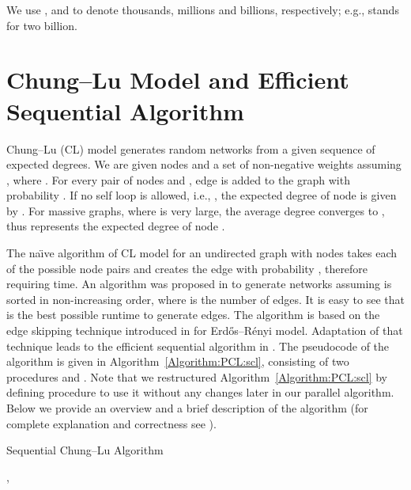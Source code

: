 \documentclass[conference,letterpaper,10pt]{IEEEtran}
\begin{document}
We use ,  and  to denote thousands, millions and billions, respectively; e.g.,  stands for two billion.


\section{Chung--Lu Model and Efficient Sequential Algorithm}
\label{Section:PCL:chung-lu-model}
Chung--Lu (CL) model \cite{Chung2002} generates random networks from a given sequence of expected degrees. We are given  nodes and a set of non-negative weights  assuming , where  \cite{Chung2002}. For every pair of nodes  and , edge  is added to the graph with probability .
If no self loop is allowed, i.e., , the expected degree of node  is given by . For massive graphs, where  is very large, the average degree converges to , thus  represents the expected degree of node  \cite{Miller2011}.

The na\"{\i}ve algorithm of CL model for an undirected graph with  nodes takes each of the  possible node pairs  and creates the edge with probability , therefore requiring  time. An  algorithm was proposed in \cite{Miller2011}  to generate networks assuming  is sorted in non-increasing order, where  is the number of edges. It is easy to see that  is the best possible runtime to generate  edges. The algorithm is based on the edge skipping technique introduced in \cite{Batagelj2005} for Erd\H{o}s--R\'enyi model. Adaptation of that technique leads to the efficient sequential algorithm in \cite{Miller2011}. The pseudocode of the algorithm is given in Algorithm~\ref{Algorithm:PCL:scl}, consisting of two procedures  and . Note that we restructured Algorithm~\ref{Algorithm:PCL:scl} by defining procedure  to use it without any changes later in our parallel algorithm. Below we provide an overview and a brief description of the algorithm (for complete explanation and correctness see \cite{Miller2011}). 
\begin{algorithm}[t]
\caption{Sequential Chung--Lu Algorithm}
\label{Algorithm:PCL:scl}
\begin{algorithmic}[1]
	\State{}\label{Line:PCL:SCL:S}
	\label{Line:PCL:SCL:CreateEdges}
\EndProcedure
{}
	\State{}
	\ForAll {  }\label{Line:PCL:SCL:foralli}
		\State \label{Line:PCL:SCL:j}, {}
		\label{Line:PCL:SCL:while}
		    \If{}
			    \State{}\label{Line:PCL:SCL:delta}		
			\Else
				\State{}
		    \EndIf
		    \State{}\label{Line:PCL:SCL:v} 
		    \If{}
		        \State{ }\label{Line:PCL:SCL:q}
		        \If{} 
			        \State{}\label{Line:PCL:SCL:E}
	            \EndIf
	            \State{,\quad}\label{Line:PCL:SCL:jv1}
		    \EndIf
		\EndWhile	
	\EndFor
	\State{\Return {}}
\EndProcedure
\end{algorithmic}
\end{algorithm}
\end{document}
